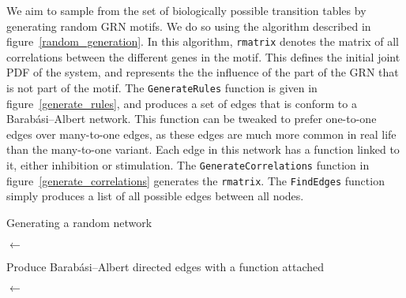 \documentclass[../main.tex]{subfiles}
\begin{document}
We aim to sample from the set of biologically possible transition tables by generating random GRN motifs.
We do so using the algorithm described in figure~\ref{random_generation}.
In this algorithm, \texttt{rmatrix} denotes the matrix of all correlations between the different genes in the motif.
This defines the initial joint PDF of the system, and represents the the influence of the part of the GRN that is not part of the motif.
The \texttt{GenerateRules} function is given in figure~\ref{generate_rules}, and produces a set of edges that is conform to a Barabási–Albert network.
This function can be tweaked to prefer one-to-one edges over many-to-one edges, as these edges are much more common in real life than the many-to-one variant.
Each edge in this network has a function linked to it, either inhibition or stimulation.
The \texttt{GenerateCorrelations} function in figure~\ref{generate_correlations} generates the \texttt{rmatrix}.
The \texttt{FindEdges} function simply produces a list of all possible edges between all nodes.

\begin{algorithm}[H]
    \label{random_generation}
    \caption{Generating a random network}

    \BlankLine

    \Edges $\leftarrow$ \FindEdges{\Nodes} 
\end{algorithm}

\begin{algorithm}[H]
    \label{generate_rules}
    \caption{Produce Barabási–Albert directed edges with a function attached}

    \BlankLine

    \Edges $\leftarrow$ \FindEdges{\Nodes} 
\end{algorithm}
\end{document}
